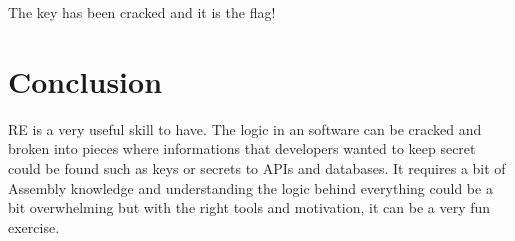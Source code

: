 The key has been cracked and it is the flag!

\section{Conclusion}
\label{s:conclusion-lab-5}
RE is a very useful skill to have. The logic in an software can be cracked and
broken into pieces where informations that developers wanted to keep secret
could be found such as keys or secrets to APIs and databases. It requires a bit
of Assembly knowledge and understanding the logic behind everything could be a
bit overwhelming but with the right tools and motivation, it can be a very fun
exercise.
